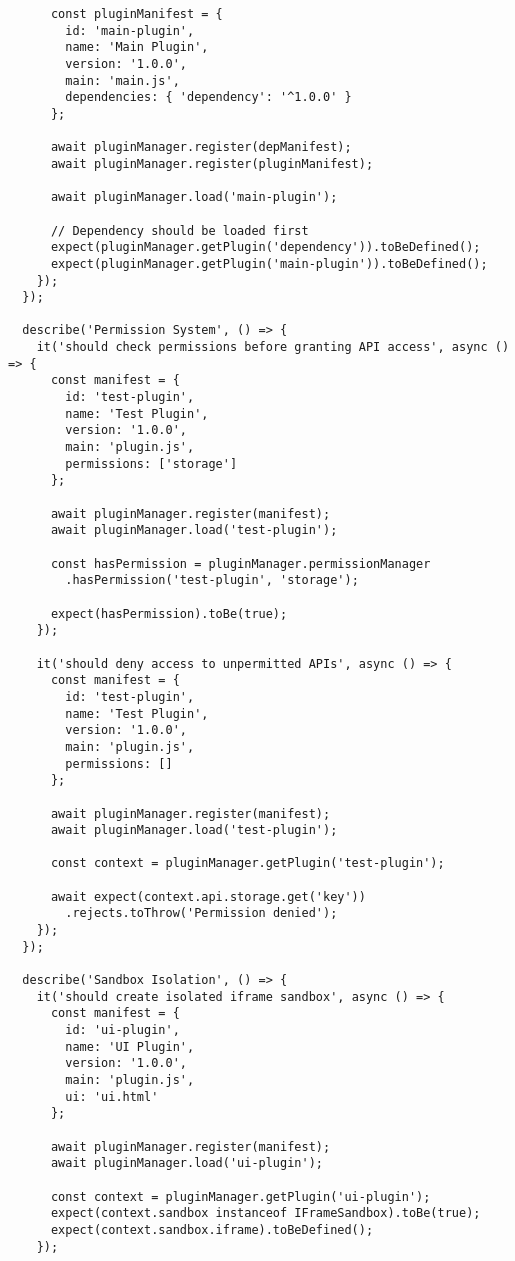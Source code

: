 \documentclass[11pt]{article}
\begin{document}
\begin{verbatim}
      const pluginManifest = {
        id: 'main-plugin',
        name: 'Main Plugin',
        version: '1.0.0',
        main: 'main.js',
        dependencies: { 'dependency': '^1.0.0' }
      };
      
      await pluginManager.register(depManifest);
      await pluginManager.register(pluginManifest);
      
      await pluginManager.load('main-plugin');
      
      // Dependency should be loaded first
      expect(pluginManager.getPlugin('dependency')).toBeDefined();
      expect(pluginManager.getPlugin('main-plugin')).toBeDefined();
    });
  });
  
  describe('Permission System', () => {
    it('should check permissions before granting API access', async () => {
      const manifest = {
        id: 'test-plugin',
        name: 'Test Plugin',
        version: '1.0.0',
        main: 'plugin.js',
        permissions: ['storage']
      };
      
      await pluginManager.register(manifest);
      await pluginManager.load('test-plugin');
      
      const hasPermission = pluginManager.permissionManager
        .hasPermission('test-plugin', 'storage');
      
      expect(hasPermission).toBe(true);
    });
    
    it('should deny access to unpermitted APIs', async () => {
      const manifest = {
        id: 'test-plugin',
        name: 'Test Plugin',
        version: '1.0.0',
        main: 'plugin.js',
        permissions: []
      };
      
      await pluginManager.register(manifest);
      await pluginManager.load('test-plugin');
      
      const context = pluginManager.getPlugin('test-plugin');
      
      await expect(context.api.storage.get('key'))
        .rejects.toThrow('Permission denied');
    });
  });
  
  describe('Sandbox Isolation', () => {
    it('should create isolated iframe sandbox', async () => {
      const manifest = {
        id: 'ui-plugin',
        name: 'UI Plugin',
        version: '1.0.0',
        main: 'plugin.js',
        ui: 'ui.html'
      };
      
      await pluginManager.register(manifest);
      await pluginManager.load('ui-plugin');
      
      const context = pluginManager.getPlugin('ui-plugin');
      expect(context.sandbox instanceof IFrameSandbox).toBe(true);
      expect(context.sandbox.iframe).toBeDefined();
    });
    

\end{verbatim}
\end{document}
